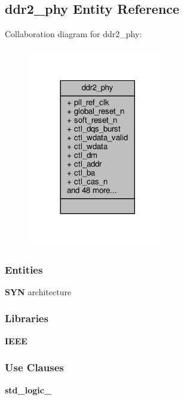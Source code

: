 \subsection{ddr2\+\_\+phy Entity Reference}
\label{classddr2__phy}


Collaboration diagram for ddr2\+\_\+phy\+:\nopagebreak
\begin{figure}[H]
\begin{center}
\leavevmode
\includegraphics[width=173pt]{d3/d18/classddr2__phy__coll__graph}
\end{center}
\end{figure}
\subsubsection*{Entities}
\begin{DoxyCompactItemize}
\item 
{\bf S\+YN} architecture
\end{DoxyCompactItemize}
\subsubsection*{Libraries}
 \begin{DoxyCompactItemize}
\item 
{\bf I\+E\+EE} 
\end{DoxyCompactItemize}
\subsubsection*{Use Clauses}
 \begin{DoxyCompactItemize}
\item 
{\bf std\+\_\+logic\+\_}   
\end{DoxyCompactItemize}
